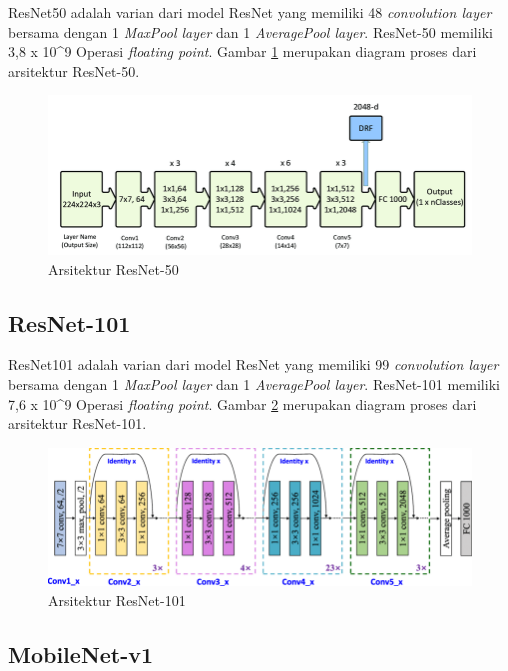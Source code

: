 ResNet50 adalah varian dari model ResNet yang memiliki 48 \textit{convolution layer} bersama dengan 1 \textit{MaxPool layer} dan 1 \textit{AveragePool layer}. ResNet-50 memiliki 3,8 x 10\^{}9 Operasi \textit{floating point}. Gambar \ref{fig:resnet50-arch} merupakan diagram proses dari arsitektur ResNet-50.
\begin{figure}[H]
	\centering
	\includegraphics[scale=0.25]{gambar/resnet50-arch.png}
	\caption{Arsitektur ResNet-50 \citep{resnet50-arch}}
	\label{fig:resnet50-arch}
\end{figure}

\subsection{ResNet-101}
\label{subsec:resnet101-definition}

ResNet101 adalah varian dari model ResNet yang memiliki 99 \textit{convolution layer} bersama dengan 1 \textit{MaxPool layer} dan 1 \textit{AveragePool layer}. ResNet-101 memiliki 7,6 x 10\^{}9 Operasi \textit{floating point}. Gambar \ref{fig:resnet101-arch} merupakan diagram proses dari arsitektur ResNet-101.
\begin{figure}[H]
	\centering
	\includegraphics[scale=0.25]{gambar/resnet101-arch.png}
	\caption{Arsitektur ResNet-101 \citep{resnet101-arch}}
	\label{fig:resnet101-arch}
\end{figure}

\subsection{MobileNet-v1}
\label{subsec:mobilenetv1-definition}

